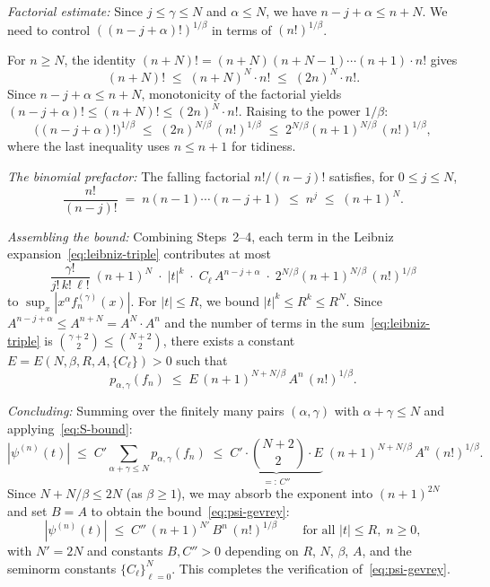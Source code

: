 \documentclass[12pt]{article}
\theoremstyle{definition}
\begin{document}
\medskip
\noindent\emph{Factorial estimate:}
Since $j\le\gamma\le N$ and $\alpha\le N$, we have
$n-j+\alpha \le n+N$.  We need to control
$((n-j+\alpha)!)^{1/\beta}$ in terms of $(n!)^{1/\beta}$.

For $n\ge N$, the identity $(n+N)! = (n+N)(n+N-1)\cdots(n+1)\cdot n!$
gives
\begin{equation}\label{eq:factorial-ineq}
  (n+N)!
  \;\le\; (n+N)^N\cdot n!
  \;\le\; (2n)^N\cdot n!.
\end{equation}
Since $n-j+\alpha\le n+N$, monotonicity of the factorial yields
$(n-j+\alpha)!\le (n+N)!\le (2n)^N\cdot n!$.  Raising to the power
$1/\beta$:
\begin{equation}\label{eq:factorial-beta}
  \bigl((n-j+\alpha)!\bigr)^{1/\beta}
  \;\le\; (2n)^{N/\beta}\,(n!)^{1/\beta}
  \;\le\; 2^{N/\beta}(n+1)^{N/\beta}\,(n!)^{1/\beta},
\end{equation}
where the last inequality uses $n\le n+1$ for tidiness.

\medskip
\noindent\emph{The binomial prefactor:}
The falling factorial $n!/(n-j)!$ satisfies, for $0\le j\le N$,
\[
  \frac{n!}{(n-j)!}
  \;=\; n(n-1)\cdots(n-j+1)
  \;\le\; n^j
  \;\le\; (n+1)^N.
\]

\medskip
\noindent\emph{Assembling the bound:}
Combining Steps~2--4, each term in the Leibniz
expansion~\eqref{eq:leibniz-triple} contributes at most
\[
  \frac{\gamma!}{j!\,k!\,\ell!}\;
  (n+1)^N\;\cdot\;|t|^k\;\cdot\;
  C_\ell\,A^{n-j+\alpha}\;\cdot\;
  2^{N/\beta}(n+1)^{N/\beta}\,(n!)^{1/\beta}
\]
to $\sup_x|x^\alpha f_n^{(\gamma)}(x)|$.  For $|t|\le R$, we bound
$|t|^k\le R^k\le R^N$.  Since $A^{n-j+\alpha}\le A^{n+N}
= A^N\cdot A^n$ and the number of terms in the
sum~\eqref{eq:leibniz-triple} is $\binom{\gamma+2}{2}\le
\binom{N+2}{2}$, there exists a constant $E = E(N,\beta,R,A,\{C_\ell\})>0$
such that
\[
  p_{\alpha,\gamma}(f_n)
  \;\le\;
  E\,(n+1)^{N+N/\beta}\,A^n\,(n!)^{1/\beta}.
\]

\medskip
\noindent\emph{Concluding:}
Summing over the finitely many pairs $(\alpha,\gamma)$ with
$\alpha+\gamma\le N$ and applying~\eqref{eq:S-bound}:
\[
  |\psi^{(n)}(t)|
  \;\le\;
  C'\!\sum_{\alpha+\gamma\le N} p_{\alpha,\gamma}(f_n)
  \;\le\;
  \underbrace{C'\cdot\binom{N+2}{2}\cdot E}_{=:\,C''}\;
  (n+1)^{N+N/\beta}\,A^n\,(n!)^{1/\beta}.
\]
Since $N+N/\beta\le 2N$ (as $\beta\ge 1$), we may absorb the
exponent into $(n+1)^{2N}$ and set $B=A$ to obtain the
bound~\eqref{eq:psi-gevrey}:
\[
  |\psi^{(n)}(t)|
  \;\le\;
  C''\,(n+1)^{N'}\,B^n\,(n!)^{1/\beta}
  \qquad\text{for all }|t|\le R,\; n\ge 0,
\]
with $N' = 2N$ and constants $B,C''>0$ depending on $R$, $N$,
$\beta$, $A$, and the seminorm constants
$\{C_\ell\}_{\ell=0}^N$.  This completes the verification
of~\eqref{eq:psi-gevrey}.
\end{document}
